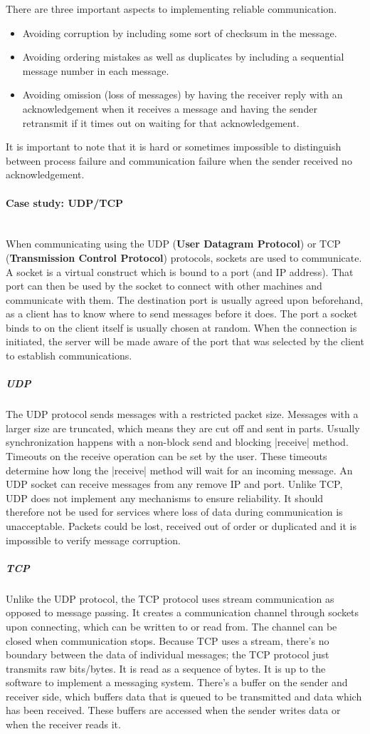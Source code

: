 \documentclass[a4paper]{article}
\newcommand{\subsubsubsection}[1]{\paragraph{#1}\mbox{}\\}
\begin{document}
There are three important aspects to implementing reliable communication.

\begin{itemize}
\item Avoiding corruption by including some sort of checksum in the message.
\item Avoiding ordering mistakes as well as duplicates by including a sequential message number in each message.
\item Avoiding omission (loss of messages) by having the receiver reply with an acknowledgement when it receives a message and having the sender retransmit if it times out on waiting for that acknowledgement.
\end{itemize}

It is important to note that it is hard or sometimes impossible to distinguish between process failure and communication failure when the sender received no acknowledgement.

\subsubsubsection{Case study: UDP/TCP}

When communicating using the UDP (\textbf{User Datagram Protocol}) or TCP (\textbf{Transmission Control Protocol}) protocols, sockets are used to communicate. A socket is a virtual construct which is bound to a port (and IP address). That port can then be used by the socket to connect with other machines and communicate with them. The destination port is usually agreed upon beforehand, as a client has to know where to send messages before it does. The port a socket binds to on the client itself is usually chosen at random. When the connection is initiated, the server will be made aware of the port that was selected by the client to establish communications.

\subparagraph*{UDP} The UDP protocol sends messages with a restricted packet size. Messages with a larger size are truncated, which means they are cut off and sent in parts. Usually synchronization happens with a non-block send and blocking |receive| method. Timeouts on the receive operation can be set by the user. These timeouts determine how long the |receive| method will wait for an incoming message. An UDP socket can receive messages from any remove IP and port. Unlike TCP, UDP does not implement any mechanisms to ensure reliability. It should therefore not be used for services where loss of data during communication is unacceptable. Packets could be lost, received out of order or duplicated and it is impossible to verify message corruption.

\subparagraph*{TCP} Unlike the UDP protocol, the TCP protocol uses stream communication as opposed to message passing. It creates a communication channel through sockets upon connecting, which can be written to or read from. The channel can be closed when communication stops. Because TCP uses a stream, there's no boundary between the data of individual messages; the TCP protocol just transmits raw bits/bytes. It is read as a sequence of bytes. It is up to the software to implement a messaging system. There's a buffer on the sender and receiver side, which buffers data that is queued to be transmitted and data which has been received. These buffers are accessed when the sender writes data or when the receiver reads it.
\end{document}
